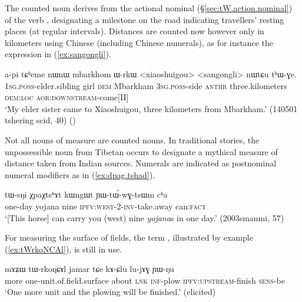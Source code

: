 The counted noun  derives from the  actional nominal (§\ref{sec:tW.action.nominal}) of the verb , designating a milestone on the road indicating travellers' resting places (at regular intervals). Distances are counted now however only in kilometers using Chinese (including Chinese numerals), as for instance the expression   in (\ref{ex:sangongli}).

\begin{exe}
\ex \label{ex:sangongli} 
\gll a-pi tɕʰeme nɯnɯ mbarkhom ɯ-rkɯ <xiaoshuigou> <sangongli> nɯtɕu tʰɯ-ɣe. \\
\textsc{1sg}.\textsc{poss}-elder.sibling girl \textsc{dem} Mbarkham \textsc{3sg}.\textsc{poss}-side  \textsc{anthr} three.kilometers \textsc{dem}:\textsc{loc} \textsc{aor}:\textsc{downstream}-come[II] \\
\glt  `My elder sister came to Xiaoshuigou, three kilometers from Mbarkham.' (140501 tshering scid, 40)
()
\end{exe}

Not all nouns of measure are counted nouns.  In traditional stories, the unpossessible noun  from Tibetan  occurs to designate a mythical measure of distance taken from Indian sources. Numerals are indicated as postnominal numeral modifiers as in (\ref{ex:dpag.tshad}).

\begin{exe}
\ex \label{ex:dpag.tshad}
\gll  tɯ-sŋi χpaχtsʰɤt kɯngɯt ɲɯ-tɯ́-wɣ-tsɯm cʰa \\
one-day yojana nine \textsc{ipfv}:\textsc{west}-2-\textsc{inv}-take.away can:\textsc{fact} \\
\glt `[This horse] can carry you (west) nine \textit{yojana}s in one day.'  (2003smanmi, 57)
\end{exe}

For measuring the surface of fields, the term , illustrated by example (\ref{ex:tWrkoNCAl}), is still in use.

\begin{exe}
\ex \label{ex:tWrkoNCAl}
\gll mɤʑɯ tɯ-rkoŋɕɤl jamar tɕe kɤ-ɕlu lu-jɤɣ ɲɯ-ŋu \\
more one-unit.of.field.surface about \textsc{lnk} \textsc{inf}-plow \textsc{ipfv}:\textsc{upstream}-finish \textsc{sens}-be \\
\glt `One more unit and the plowing will be finished.' (elicited)
\end{exe}


